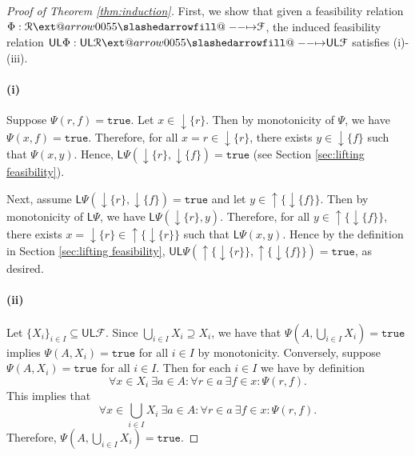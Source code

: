 \documentclass[12pt]{article}
\makeatletter
\theoremstyle{definition}
\theoremstyle{plain}
\theoremstyle{plain}
\theoremstyle{plain}
\theoremstyle{plain}
\theoremstyle{remark}
\theoremstyle{remark}
\newcommand{\mc}[1]{\mathcal{#1}}
\newcommand{\sub}{\subseteq}
\newcommand{\low}{\mathsf{L}}
\newcommand{\upper}{\mathsf{U}}
\newcommand{\true}{\mathtt{true}}
\newcommand{\upc}[1]{{\uparrow #1}}
\newcommand{\lwc}[1]{{\downarrow #1}}
\def\slashedarrowfill@#1#2#3#4#5{%
	$\m@th\thickmuskip0mu\medmuskip\thickmuskip\thinmuskip\thickmuskip
	\relax#5#1\mkern-7mu%
	\cleaders\hbox{$#5\mkern-2mu#2\mkern-2mu$}\hfill
	\mathclap{#3}\mathclap{#2}%
	\cleaders\hbox{$#5\mkern-2mu#2\mkern-2mu$}\hfill
	\mkern-7mu#4$%
}
\def\rightslashedarrowfill@{%
	\slashedarrowfill@\relbar\relbar\mapstochar\rightarrow}
\newcommand\xslashedrightarrow[2][]{%
	\ext@arrow 0055{\rightslashedarrowfill@}{#1}{#2}}
\makeatother
\begin{document}
\begin{proof}[Proof of Theorem \ref{thm:induction}]
	First, we show that given a feasibility relation $\Phi: \mc{R} \xslashedrightarrow{} \mc{F}$, the induced feasibility relation $\upper\low\Phi:  \upper\low\mc{R} \xslashedrightarrow{} \upper\low\mc{F}$ satisfies (i)-(iii).
	
	\paragraph{(i)} Suppose $\Psi(r,f) = \true$. Let $x \in \lwc{\{r\}}$. Then by monotonicity of $\Psi$, we have $\Psi(x,f) = \true$. Therefore, for all $x = r \in \lwc{\{r\}}$, there exists $y \in \lwc{\{f\}}$ such that $\Psi(x,y)$. Hence, $\low\Psi(\lwc{\{r\}}, \lwc{\{f\}}) = \true$ (see Section \ref{sec:lifting feasibility}).
	
	Next, assume $\low\Psi(\lwc{\{r\}}, \lwc{\{f\}}) = \true$ and let $y \in \upc\{\lwc\{f\} \}$. Then by monotonicity of $\low\Psi$, we have $\low\Psi(\lwc{\{r\}},y)$. Therefore, for all $y \in \upc\{\lwc\{f\} \}$, there exists $x =  \lwc{\{r\}} \in \upc\{\lwc\{r\} \}$ such that $\low\Psi(x,y)$. Hence by the definition in Section \ref{sec:lifting feasibility}, $\upper\low\Psi( \upc\{\lwc\{r\} \} ,\upc\{\lwc\{f\} \}) = \true$, as desired.
	
	\paragraph{(ii)} Let $\{X_i\}_{i \in I} \sub \upper\low\mc{F}$. Since $\bigcup_{i \in I} X_i \supseteq X_i$, we have that $\Psi(A, \bigcup_{i \in I} X_i) = \true $ implies $\Psi(A,  X_i) = \true $ for all $i \in I$ by monotonicity. Conversely, suppose $\Psi(A,  X_i) = \true $ for all $i \in I$. Then for each $i \in I$ we have by definition
	$$\forall x \in X_i \: \exists a \in A : \forall r \in a \: \exists f \in x : \Psi(r,f).$$
	This implies that
	$$\forall x \in \bigcup_{i \in I} X_i \: \exists a \in A : \forall r \in a \: \exists f \in x : \Psi(r,f).$$
	Therefore, $\Psi(A, \bigcup_{i \in I} X_i) = \true $.
	

\end{proof}
\end{document}
